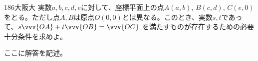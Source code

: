 \begin{prob}{186}{}{大阪大}
 実数$a, b, c, d, e$に対して、座標平面上の点$A(a,b)$, $B(c,d)$, $C(e,0)$ をとる。ただし点$A, B$は原点$O(0,0)$とは異なる。このとき、実数$s, t$であって、$s\vvv{OA}+t\vvv{OB}=\vvv{OC}$ を満たすものが存在するための必要十分条件を求めよ。
\end{prob}
ここに解答を記述。